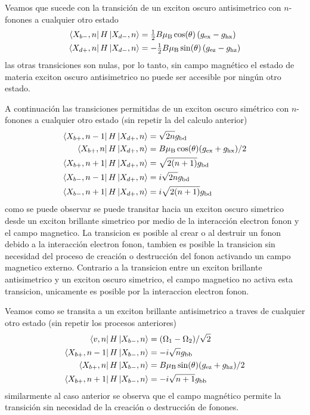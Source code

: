 \documentclass[main.tex]{subfiles}
\begin{document}
Veamos que sucede con la transición de un exciton oscuro antisimetrico con $n$-fonones a cualquier otro estado
\begin{align*}
    \bra{X_{b-},n} H \ket{X_{d-},n} &= \tfrac{1}{2} B \mu _{\text{B}} \cos (\theta ) \left(g_{\text{ex}}-g_{\text{hx}}\right)\\
    \bra{X_{d+},n} H \ket{X_{d-},n} &= -\tfrac{1}{2} B \mu _{\text{B}} \sin (\theta ) \left(g_{\text{ez}}-g_{\text{hz}}\right)
\end{align*}
las otras transiciones son nulas, por lo tanto, sin campo magnético el estado de materia exciton oscuro antisimetrico  no puede ser accesible por ningún otro estado. 

A continuación las transiciones permitidas de un exciton oscuro simétrico con $n$-fonones a cualquier otro estado (sin repetir la del calculo anterior)
\begin{align*}
    \bra{X_{b+},n-1} H \ket{X_{d+},n} &= \sqrt{2n} g_\text{bd}\\
    \bra{X_{b+},n} H \ket{X_{d+},n} &= B \mu_\text{B} \cos(\theta ) (g_\text{ex}+g_\text{hx})/2\\
    \bra{X_{b+},n+1} H \ket{X_{d+},n} &= \sqrt{2(n+1)} g_\text{bd}\\
    \bra{X_{b-},n-1} H \ket{X_{d+},n} &= i \sqrt{2n} g_\text{bd}\\
    \bra{X_{b-},n+1} H \ket{X_{d+},n} &= i \sqrt{2(n+1)} g_\text{bd}
\end{align*}
como se puede observar se puede transitar hacia un exciton oscuro simetrico desde un exciton brillante simetrico por medio de la interacción electron fonon y el campo magnetico. La transicion es posible al crear o al destruir un fonon debido a la interacción electron fonon, tambien es posible la transicion sin necesidad del proceso de creación o destrucción del fonon activando un campo magnetico externo. Contrario a la transicion entre un exciton brillante antisimetrico y un exciton oscuro simetrico, el campo magnetico no activa esta transicion, unicamente es posible por la interaccion electron fonon.

Veamos como se transita a un exciton brillante antisimetrico a traves de cualquier otro estado (sin repetir los procesos anteriores)
\begin{align*}
    \bra{v,n} H \ket{X_{b-},n} &= (\Omega_1-\Omega_2)/\sqrt{2}\\
    \bra{X_{b+},n-1} H \ket{X_{b-},n} &= -i \sqrt{n} g_\text{bb}\\
    \bra{X_{b+},n} H \ket{X_{b-},n} &= B \mu_\text{B} \sin(\theta) (g_\text{ez}+g_\text{hz})/2\\
    \bra{X_{b+},n+1} H \ket{X_{b-},n} &= -i \sqrt{n+1} g_\text{bb}
\end{align*}
similarmente al caso anterior se observa que el campo magnético permite la transición sin necesidad de la creación o destrucción de fonones.
\end{document}
